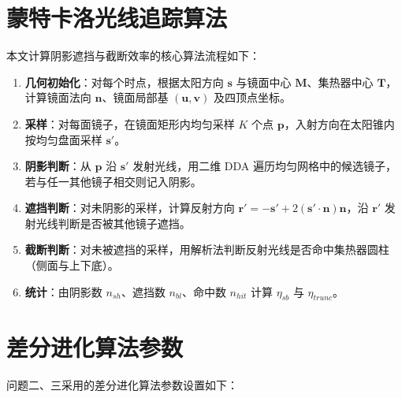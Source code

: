 \documentclass[12pt]{ctexart}
\begin{document}
\appendix
\section{蒙特卡洛光线追踪算法}
本文计算阴影遮挡与截断效率的核心算法流程如下：

\begin{enumerate}
\item \textbf{几何初始化}：对每个时点，根据太阳方向 $\mathbf{s}$ 与镜面中心 $\mathbf{M}$、集热器中心 $\mathbf{T}$，计算镜面法向 $\mathbf{n}$、镜面局部基 $(\mathbf{u},\mathbf{v})$ 及四顶点坐标。
\item \textbf{采样}：对每面镜子，在镜面矩形内均匀采样 $K$ 个点 $\mathbf{p}$，入射方向在太阳锥内按均匀盘面采样 $\mathbf{s}'$。
\item \textbf{阴影判断}：从 $\mathbf{p}$ 沿 $\mathbf{s}'$ 发射光线，用二维 DDA 遍历均匀网格中的候选镜子，若与任一其他镜子相交则记入阴影。
\item \textbf{遮挡判断}：对未阴影的采样，计算反射方向 $\mathbf{r}'=-\mathbf{s}'+2(\mathbf{s}'\cdot\mathbf{n})\mathbf{n}$，沿 $\mathbf{r}'$ 发射光线判断是否被其他镜子遮挡。
\item \textbf{截断判断}：对未被遮挡的采样，用解析法判断反射光线是否命中集热器圆柱（侧面与上下底）。
\item \textbf{统计}：由阴影数 $n_{sh}$、遮挡数 $n_{bl}$、命中数 $n_{hit}$ 计算 $\eta_{sb}$ 与 $\eta_{trunc}$。
\end{enumerate}

\section{差分进化算法参数}
问题二、三采用的差分进化算法参数设置如下：
\begin{center}
\end{center}
\end{document}
